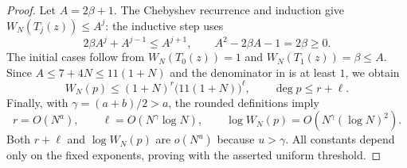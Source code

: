 \begin{proof}
Let $A=2\beta+1$.  The Chebyshev recurrence and induction give
$W_N(T_j(z))\le A^j$: the inductive step uses
\[
  2\beta A^j+A^{j-1}\le A^{j+1},
  \qquad A^2-2\beta A-1=2\beta\ge0.
\]
The initial cases follow from $W_N(T_0(z))=1$ and
$W_N(T_1(z))=\beta\le A$.  Since $A\le7+4N\le11(1+N)$ and the denominator
in  is at least $1$, we obtain
\[
  W_N(p)\le(1+N)^r\bigl(11(1+N)\bigr)^\ell,
  \qquad \deg p\le r+\ell.
\]
Finally, with $\gamma=(a+b)/2>a$, the rounded definitions imply
\[
  r=O(N^a),\qquad
  \ell=O(N^\gamma\log N),\qquad
  \log W_N(p)=O\!\left(N^\gamma(\log N)^2\right).
\]
Both $r+\ell$ and $\log W_N(p)$ are $o(N^u)$ because $u>\gamma$.
All constants depend only on the fixed exponents, proving
 with the asserted uniform threshold.
\end{proof}
